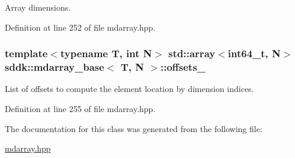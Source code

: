 Array dimensions. 



Definition at line 252 of file mdarray.\+hpp.

\hypertarget{classsddk_1_1mdarray__base_a7ad3a05f61945373d526ce2c33438b32}{}
\subsubsection[{offsets\+\_\+}]{\setlength{\rightskip}{0pt plus 5cm}template$<$typename T, int N$>$ std\+::array$<$int64\+\_\+t, N$>$ {\bf sddk\+::mdarray\+\_\+base}$<$ T, N $>$\+::offsets\+\_\+\hspace{0.3cm}{\ttfamily [protected]}}\label{classsddk_1_1mdarray__base_a7ad3a05f61945373d526ce2c33438b32}


List of offsets to compute the element location by dimension indices. 



Definition at line 255 of file mdarray.\+hpp.



The documentation for this class was generated from the following file\+:\begin{DoxyCompactItemize}
\item 
\hyperlink{mdarray_8hpp}{mdarray.\+hpp}\end{DoxyCompactItemize}
